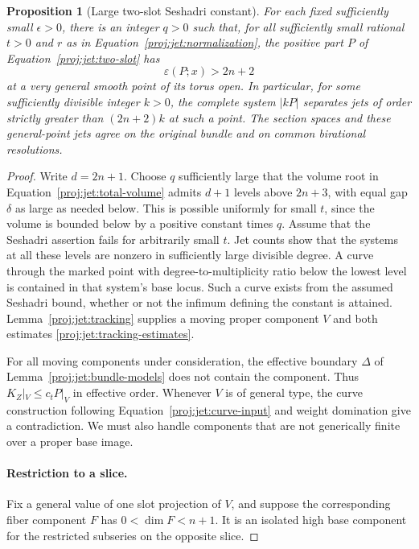 \documentclass[11pt,letterpaper]{article}
\newtheorem{proposition}[theorem]{Proposition}
\theoremstyle{definition}
\theoremstyle{remark}
\begin{document}
\begin{proposition}[Large two-slot Seshadri constant]\label{proj:prop:large-seshadri}
For each fixed sufficiently small \(\epsilon>0\), there is an integer
\(q>0\) such that, for all sufficiently small rational \(t>0\) and
\(r\) as in Equation~\eqref{proj:jet:normalization}, the positive part
\(P\) of Equation~\eqref{proj:jet:two-slot} has
\[
 \varepsilon(P;x)>2n+2
\]
at a very general smooth point of its torus open.
In particular, for some sufficiently divisible integer \(k>0\),
the complete system \(|kP|\) separates jets of order strictly
greater than \((2n+2)k\) at such a point.
The section spaces and these general-point jets agree on the
original bundle and on common birational resolutions.
\end{proposition}

\begin{proof}
Write \(d=2n+1\).  Choose \(q\) sufficiently large that the volume
root in Equation~\eqref{proj:jet:total-volume} admits \(d+1\) levels above
\(2n+3\), with equal gap \(\delta\) as large as needed below.
This is possible uniformly for small \(t\), since the volume is
bounded below by a positive constant times \(q\).
Assume that the Seshadri assertion fails for arbitrarily small \(t\).
Jet counts show that the systems at all these levels are nonzero
in sufficiently large divisible degree.  A curve through the marked
point with degree-to-multiplicity ratio below the lowest level is
contained in that system's base locus.  Such a curve exists from
the assumed Seshadri bound, whether or not the infimum defining
the constant is attained.  Lemma~\ref{proj:jet:tracking} supplies a
moving proper component \(V\) and both estimates
\eqref{proj:jet:tracking-estimates}.

For all moving components under consideration, the effective
boundary \(\Delta\) of Lemma~\ref{proj:jet:bundle-models} does not contain
the component.  Thus \(K_Z|_V\le c_tP|_V\) in effective order.
Whenever \(V\) is of general type, the curve construction following
Equation~\eqref{proj:jet:curve-input} and weight domination give a
contradiction.  We must also handle components that are not
generically finite over a proper base image.

\paragraph{Restriction to a slice.}
Fix a general value of one slot projection of \(V\), and suppose
the corresponding fiber component \(F\) has
\(0<\dim F<n+1\).  It is an isolated high base component for the
restricted subseries on the opposite slice.


\end{proof}
\end{document}

